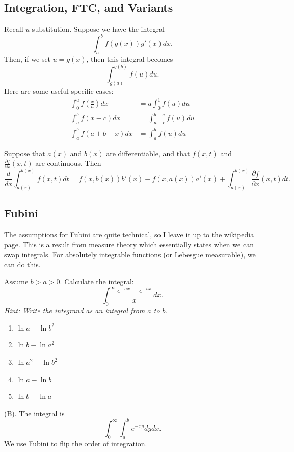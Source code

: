 \subsection{Integration, FTC, and Variants}
Recall $u$-substitution. Suppose we have the integral
\[
\int_a^b f(g(x))g'(x)dx.
\]
Then, if we set $u = g(x)$, then this integral becomes
\[
\int_{g(a)}^{g(b)} f(u) du.
\]
Here are some useful specific cases:
\begin{align*}
\int_0^a f\left(\frac{x}{a}\right)dx &= a\int_0^1 f(u)du \\
\int_a^b f(x-c) dx &= \int_{a-c}^{b-c}f(u) du \\
\int_a^b f(a+b-x) dx &= \int_a^b f(u) du
\end{align*}

\begin{theorem}
Suppose that $a(x)$ and $b(x)$ are differentiable, and that
$f(x,t)$ and $\frac{\partial f}{\partial x}(x,t)$ are continuous.
Then
\[
\frac{d}{dx}\int_{a(x)}^{b(x)}f(x,t) dt
=
f(x,b(x))b'(x) - f(x,a(x))a'(x) +
\int_{a(x)}^{b(x)}
\frac{\partial f}{\partial x}(x,t) dt.
\]
\end{theorem}


\subsection{Fubini}

The assumptions for Fubini are quite technical, so I leave it up 
to the wikipedia page. This is a result from measure theory which essentially
states when we can swap integrals. For absolutely integrable functions (or Lebesgue 
measurable), we can do this.

\begin{exercise}
Assume $b>a>0$. Calculate the integral:
\[
\int_0^\infty \frac{e^{-ax}-e^{-bx}}{x}\,dx.
\]
\textit{Hint: Write the integrand as an integral from $a$ to $b$.}
\begin{enumerate}[label=(\Alph*)]
    \item $\ln a-\ln b^2$
    \item $\ln b-\ln a^2$
    \item $\ln a^2-\ln b^2$
    \item $\ln a-\ln b$
    \item $\ln b-\ln a$
\end{enumerate}
\end{exercise}
\begin{solution}
(B). The integral is
\[
\int_0^{\infty} \int_{a}^b e^{-xy} dy dx.
\]
We use Fubini to flip the order of integration.
\end{solution}

